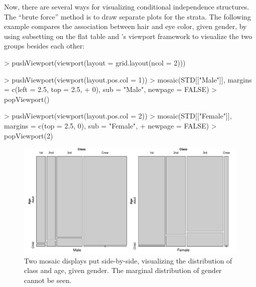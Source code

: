 \documentclass{Z}
\begin{document}
\noindent Now, there are several ways for visualizing 
conditional independence structures. The ``brute force'' method is to
draw separate plots for the strata. The following example compares 
the association between hair and eye color, given gender, by using
subsetting on the flat table and 's viewport 
framework to visualize the two groups besides each other:

\begin{Schunk}
\begin{Sinput}
> pushViewport(viewport(layout = grid.layout(ncol = 2)))
\end{Sinput}
\end{Schunk}

\begin{Schunk}
\begin{Sinput}
> pushViewport(viewport(layout.pos.col = 1))
> mosaic(STD[["Male"]], margins = c(left = 2.5, top = 2.5, 
+     0), sub = "Male", newpage = FALSE)
> popViewport()
\end{Sinput}
\end{Schunk}

\begin{Schunk}
\begin{Sinput}
> pushViewport(viewport(layout.pos.col = 2))
> mosaic(STD[["Female"]], margins = c(top = 2.5, 0), sub = "Female", 
+     newpage = FALSE)
> popViewport(2)
\end{Sinput}
\end{Schunk}

\begin{figure}[p]
\begin{center}
\includegraphics{strucplot-Variablesfig}
\caption{Two mosaic displays put side-by-side, visualizing the 
distribution of class and age, given gender. The marginal
distribution of gender cannot be seen.}
\label{fig:parttable}
\end{center}
\end{figure}
\end{document}

